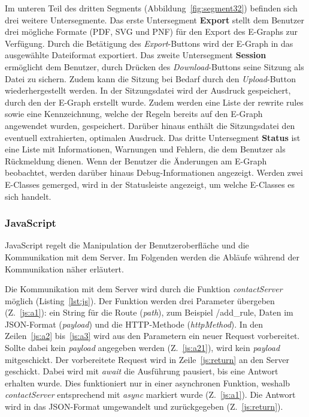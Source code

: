 Im unteren Teil des dritten Segments (Abbildung~\ref{fig:segment32}) befinden sich drei weitere Untersegmente.  
Das erste Untersegment \textbf{Export} stellt dem Benutzer drei mögliche Formate (PDF, SVG und PNF) für den Export des E-Graphs zur Verfügung. Durch die Betätigung des \textit{Export}-Buttons
wird der E-Graph in das ausgewählte Dateiformat exportiert.
Das zweite Untersegment \textbf{Session} ermöglicht dem Benutzer, durch Drücken des \textit{Download}-Buttons seine Sitzung als Datei zu sichern. Zudem kann die Sitzung bei Bedarf
durch den \textit{Upload}-Button wiederhergestellt werden. 
In der Sitzungsdatei wird der Ausdruck gespeichert, durch den der E-Graph erstellt wurde. 
Zudem werden eine Liste der rewrite rules sowie eine Kennzeichnung, welche der Regeln bereits auf den E-Graph angewendet wurden, gespeichert.
Darüber hinaus enthält die Sitzungsdatei den eventuell extrahierten, optimalen Ausdruck.
Das dritte Untersegment \textbf{Status} ist eine Liste mit Informationen, Warnungen und Fehlern, die dem Benutzer als Rückmeldung dienen. Wenn der Benutzer die Änderungen am E-Graph beobachtet, werden
darüber hinaus Debug-Informationen angezeigt. Werden zwei E-Classes gemerged, wird in der Statusleiste angezeigt, um welche E-Classes es sich handelt.  

\subsubsection{JavaScript}

JavaScript regelt die Manipulation der Benutzeroberfläche und die Kommunikation mit dem Server. Im Folgenden werden die Abläufe während der Kommunikation näher erläutert.

Die Kommunikation mit dem Server wird durch die Funktion \textit{contactServer} möglich (Listing~\ref{lst:js}).
Der Funktion werden drei Parameter übergeben (Z.~\ref{js:a1}): ein String für die Route (\textit{path}), zum Beispiel /add\_rule, Daten im JSON-Format (\textit{payload})
und die HTTP-Methode (\textit{httpMethod}). In den Zeilen~\ref{js:a2} bis~\ref{js:a3} wird aus den Parametern ein neuer Request vorbereitet. Sollte dabei kein \textit{payload}
angegeben werden (Z.~\ref{js:a21}), wird kein \textit{payload} mitgeschickt. Der vorbereitete Request wird in Zeile~\ref{js:return} an den Server geschickt. Dabei wird mit \textit{await}
die Ausführung pausiert, bis eine Antwort erhalten wurde. Dies funktioniert nur in einer asynchronen Funktion, weshalb \textit{contactServer} entsprechend mit \textit{async} 
markiert wurde (Z.~\ref{js:a1}). Die Antwort wird in das JSON-Format umgewandelt und zurückgegeben (Z.~\ref{js:return}).

